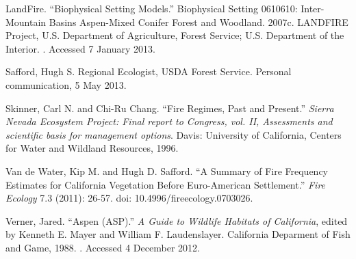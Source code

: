 \begin{hangparas}{.25in}{1}
LandFire. ``Biophysical Setting Models.'' Biophysical Setting 0610610: Inter-Mountain Basins Aspen-Mixed Conifer Forest and Woodland. 2007c. LANDFIRE Project, U.S. Department of Agriculture, Forest Service; U.S. Department of the Interior. . Accessed 7 January 2013.

Safford, Hugh S. Regional Ecologist, USDA Forest Service. Personal communication, 5 May 2013.

Skinner, Carl N. and Chi-Ru Chang. ``Fire Regimes, Past and Present.'' \emph{Sierra Nevada Ecosystem Project: Final report to Congress, vol. II, Assessments and scientific basis for management options}. Davis: University of California, Centers for Water and Wildland Resources, 1996.

Van de Water, Kip M. and Hugh D. Safford. ``A Summary of Fire Frequency Estimates for California Vegetation Before Euro-American Settlement.'' \emph{Fire Ecology} 7.3 (2011): 26-57. doi: 10.4996/fireecology.0703026.

Verner, Jared. ``Aspen (ASP).'' \emph{A Guide to Wildlife Habitats of California}, edited by Kenneth E. Mayer and William F. Laudenslayer. California Deparment of Fish and Game, 1988. . Accessed 4 December 2012.

\end{hangparas}

